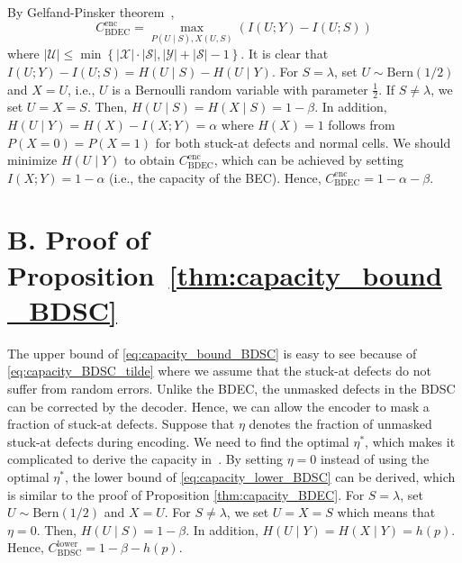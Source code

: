 \documentclass[10pt,twocolumn,twoside,submit]{JCNtran}
\begin{document}
	By Gelfand-Pinsker theorem~\cite{Gelfand1980}, 
	\begin{equation}
		C_{\text{BDEC}}^{\text{enc}} = \max_{P(U \mid S), X(U, S)}{(I(U; Y) - I(U; S))}
	\end{equation}
	where $\left| \mathcal{U} \right| \le \min{ \left\{ \left| \mathcal{X} \right| \cdot \left| \mathcal{S} \right|, \left| \mathcal{Y} \right| + \left| \mathcal{S} \right| - 1 \right\}}$. 
	It is clear that $I(U; Y) - I(U; S) = H(U \mid S) - H(U \mid Y)$. For $S = \lambda$, set $U \sim \text{Bern}(1/2)$ and $X=U$, i.e., $U$ is a Bernoulli random variable with parameter $\frac{1}{2}$. If $S \ne \lambda$, we set $U=X=S$. Then, $H(U \mid S) = H(X \mid S)  = 1 - \beta$. In addition, $	H(U\mid Y) = H(X) - I(X; Y) = \alpha$ where $H(X) = 1$ follows from $P(X = 0) = P(X = 1)$ for both stuck-at defects and normal cells. We should minimize $H(U \mid Y)$ to obtain $C_{\text{BDEC}}^{\text{enc}}$, which can be achieved by setting $I(X;Y) = 1 - \alpha$ (i.e., the capacity of the BEC). Hence, $C_{\text{BDEC}}^{\text{enc}} = 1 - \alpha - \beta$. 

\section*{B. Proof of Proposition~\ref{thm:capacity_bound_BDSC} \label{pf:capacity_bound_BDSC}}
	The upper bound of \eqref{eq:capacity_bound_BDSC} is easy to see because of \eqref{eq:capacity_BDSC_tilde} where we assume that the stuck-at defects do not suffer from random errors. Unlike the BDEC, the unmasked defects in the BDSC can be corrected by the decoder. Hence, we can allow the encoder to mask a fraction of stuck-at defects. Suppose that $\eta$ denotes the fraction of unmasked stuck-at defects during encoding. We need to find the optimal $\eta^*$, which makes it complicated to derive the capacity in~\cite{Heegard1983plbc}. By setting $\eta = 0$ instead of using the optimal $\eta^*$, the lower bound of \eqref{eq:capacity_lower_BDSC} can be derived, which is similar to the proof of Proposition \ref{thm:capacity_BDEC}. For $S = \lambda$, set $U \sim \text{Bern}(1/2)$ and $X=U$. For $S \ne \lambda$, we set $U=X=S$ which means that $\eta = 0$. Then,  $H(U \mid S) = 1 - \beta$. In addition, $H(U\mid Y) = H(X \mid Y) = h(p)$. Hence, $C_{\text{BDSC}}^{\text{lower}} = 1 - \beta - h(p)$. 
\end{document}
